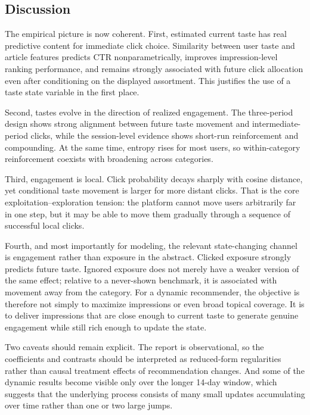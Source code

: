 \documentclass[11pt]{article}
\begin{document}
\subsection{Discussion}
\label{sec:discussion}

The empirical picture is now coherent. First, estimated current taste has real predictive content for immediate click choice. Similarity between user taste and article features predicts CTR nonparametrically, improves impression-level ranking performance, and remains strongly associated with future click allocation even after conditioning on the displayed assortment. This justifies the use of a taste state variable in the first place.

Second, tastes evolve in the direction of realized engagement. The three-period design shows strong alignment between future taste movement and intermediate-period clicks, while the session-level evidence shows short-run reinforcement and compounding. At the same time, entropy rises for most users, so within-category reinforcement coexists with broadening across categories.

Third, engagement is local. Click probability decays sharply with cosine distance, yet conditional taste movement is larger for more distant clicks. That is the core exploitation--exploration tension: the platform cannot move users arbitrarily far in one step, but it may be able to move them gradually through a sequence of successful local clicks.

Fourth, and most importantly for modeling, the relevant state-changing channel is engagement rather than exposure in the abstract. Clicked exposure strongly predicts future taste. Ignored exposure does not merely have a weaker version of the same effect; relative to a never-shown benchmark, it is associated with movement away from the category. For a dynamic recommender, the objective is therefore not simply to maximize impressions or even broad topical coverage. It is to deliver impressions that are close enough to current taste to generate genuine engagement while still rich enough to update the state.

Two caveats should remain explicit. The report is observational, so the coefficients and contrasts should be interpreted as reduced-form regularities rather than causal treatment effects of recommendation changes. And some of the dynamic results become visible only over the longer 14-day window, which suggests that the underlying process consists of many small updates accumulating over time rather than one or two large jumps.
\end{document}
